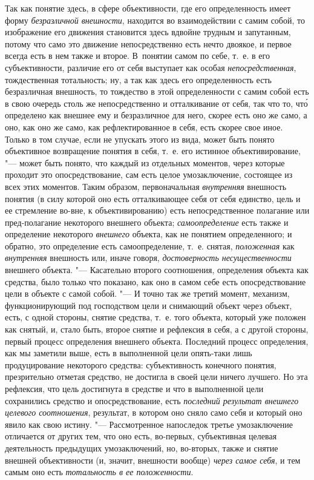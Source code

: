 Так как понятие здесь, в сфере объективности, где его
определенность имеет форму
{\em безразличной внешности},
находится во взаимодействии с самим собой, то изображение его
движения становится здесь вдвойне трудным и запутанным, потому что само это
движение непосредственно есть нечто двоякое, и первое всегда есть в нем
также и второе. В~понятии самом по себе, т.~е. в его субъективности,
различие его от себя выступает как особая
{\em непосредственная},
тождественная тотальность; ну, а так как здесь его
определенность есть безразличная внешность, то тождество в этой
определенности с самим собой есть в свою очередь столь же непосредственно и
отталкивание от себя, так что то, чт\'{о} определено как внешнее ему и
безразличное для него, скорее есть оно же само, а оно, как оно же само, как
рефлектированное в себя, есть скорее свое иное. Только в том случае, если
не упускать этого из вида, может быть понято объективное возвращение
понятия в себя, т.~е. его истинное объективирование, "--- может
быть понято, что каждый из отдельных моментов, через которые проходит это
опосредствование, сам есть целое умозаключение, состоящее из всех этих
моментов. Таким образом, первоначальная
{\em внутренняя}
внешность понятия (в силу которой оно есть отталкивающее себя
от себя единство, цель и ее стремление во-вне, к объективированию) есть
непосредственное полагание или пред-полагание некоторого внешнего объекта;
{\em самоопределение}
есть также и определение некоторого
{\em внешнего} объекта,
как не понятием определенного; и обратно, это определение есть
самоопределение, т.~е. снятая,
{\em положенная} как
{\em внутренняя}
внешность или, иначе говоря,
{\em достоверность несущественности}
внешнего объекта. "--- Касательно второго
соотношения, определения объекта как средства, было только что показано,
как оно в самом себе есть опосредствование цели в объекте с самой собой. "---
И точно так же третий момент, механизм, функционирующий под
господством цели и снимающий объект через объект, есть, с одной стороны,
снятие средства, т.~е. того объекта, который уже положен как снятый, и,
стало быть, второе снятие и рефлексия в себя, а с другой стороны, первый
процесс определения внешнего объекта. Последний процесс определения, как мы
заметили выше, есть в выполненной цели опять-таки лишь
продуцирование некоторого средства: субъективность конечного понятия,
презрительно отметая средство, не достигла в своей цели ничего лучшего. Но
эта рефлексия, что цель достигнута в средстве и что в выполненной цели
сохранились средство и опосредствование, есть
{\em последний результат внешнего
целевого соотношения}, результат, в котором оно сняло само
себя и который оно явило как свою истину. "--- Рассмотренное
напоследок третье умозаключение отличается от других тем, что оно есть,
во-первых, субъективная целевая деятельность предыдущих умозаключений, но,
во-вторых, также и снятие внешней объективности (и, значит, внешности
вообще) {\em через самое себя},
и тем самым оно есть
{\em тотальность в ее положенности}.

